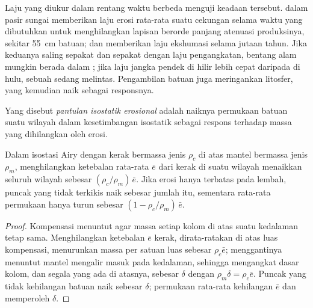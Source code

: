 Laju yang diukur dalam rentang waktu berbeda menguji keadaan tersebut. 
dalam pasir sungai memberikan laju erosi rata-rata suatu cekungan selama
waktu yang dibutuhkan untuk menghilangkan lapisan berorde panjang atenuasi
produksinya, sekitar \qty{55}{cm} batuan;  dan  memberikan
laju ekshumasi selama jutaan tahun. Jika keduanya saling sepakat
dan sepakat dengan laju pengangkatan, bentang alam mungkin berada dalam ; jika
laju jangka pendek di hilir lebih cepat daripada di hulu,
sebuah  sedang melintas. Pengambilan batuan juga meringankan
litosfer, yang kemudian naik sebagai responsnya.

\begin{definition}\label{def:b3:quantitative-geomorphology:rebound}
Yang disebut \emph{pantulan isostatik erosional} adalah
naiknya permukaan batuan suatu wilayah dalam kesetimbangan isostatik sebagai
respons terhadap massa yang dihilangkan oleh erosi.
\end{definition}

\begin{proposition}\label{prop:b3:quantitative-geomorphology:rebound}
Dalam isostasi Airy dengan kerak bermassa jenis $\rho_c$ di atas mantel bermassa jenis
$\rho_m$, menghilangkan ketebalan rata-rata $\bar e$ dari kerak di suatu wilayah menaikkan
seluruh wilayah sebesar $(\rho_c/\rho_m)\,\bar e$. Jika erosi hanya terbatas
pada lembah, puncak yang tidak terkikis naik sebesar jumlah itu, sementara rata-rata
permukaan hanya turun sebesar $(1 - \rho_c/\rho_m)\,\bar e$.
\end{proposition}

\begin{proof}
Kompensasi menuntut agar massa setiap kolom di atas suatu kedalaman tetap
sama. Menghilangkan ketebalan $\bar e$ kerak, dirata-ratakan di atas luas
kompensasi, menurunkan massa per satuan luas sebesar $\rho_c \bar e$;
menggantinya menuntut mantel mengalir masuk pada kedalaman, sehingga mengangkat dasar
kolom, dan segala yang ada di atasnya, sebesar $\delta$ dengan $\rho_m \delta = \rho_c \bar
e$. Puncak yang tidak kehilangan batuan naik sebesar $\delta$; permukaan rata-rata kehilangan
$\bar e$ dan memperoleh $\delta$.
\end{proof}

